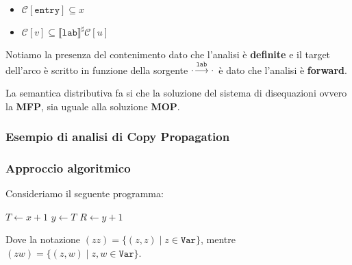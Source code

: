 \begin{itemize}
    \item $\mathcal{C}[\texttt{entry}] \subseteq x$ 
    \item $\mathcal{C}[v] \subseteq \llbracket \texttt{lab}\rrbracket^\sharp \mathcal{C}[u]$
\end{itemize}
Notiamo la presenza del contenimento dato che l'analisi è \textbf{definite} e il target 
dell'arco è scritto in funzione della sorgente $\cdot \stackrel{\texttt{lab}}{\longrightarrow} \cdot$ è dato 
che l'analisi è \textbf{forward}.

La  semantica distributiva fa si che la soluzione del sistema di disequazioni ovvero la 
\textbf{MFP}, sia uguale alla soluzione \textbf{MOP}. 

\subsubsection{Esempio di analisi di Copy Propagation}
\subsubsection{Approccio algoritmico}

\begin{minipage}{0.5\textwidth}
    Consideriamo il seguente programma:

    \begin{algorithm}[H]
        $T \gets x+ 1$\;
        $y \gets T$\;
        $R \gets y + 1$\;
    \end{algorithm}

    Dove la notazione $(zz) = \{(z,z) \mid z \in \texttt{Var}\}$, mentre 
    $(zw) = \{(z,w) \mid z,w \in \texttt{Var}\}$.
    
    \end{minipage} 
    \begin{minipage}{0.5\textwidth}
    \begin{figure}[H]
        \centering
    \end{figure}
    \end{minipage}


